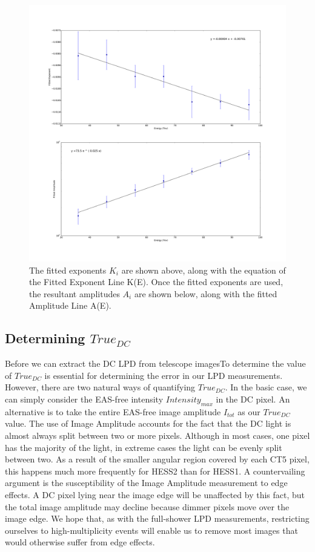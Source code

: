 \documentclass[11pt]{article}
\begin{document}
\begin{figure}
\begin{center}
\includegraphics[width=\textwidth]{lpdpowerlaw}
\caption{The fitted exponents $K_{i}$ are shown above, along with the equation of the Fitted Exponent Line K(E). Once the fitted exponents are used, the resultant amplitudes $A_{i}$ are shown below, along with the fitted Amplitude Line A(E).}
\label{fig:powerlawlpd}
\end{center}
\end{figure}

\subsection{Determining $True_{DC}$}
Before we can extract the DC LPD from telescope imagesTo determine the value of $True_{DC}$ is essential for determining the error in our LPD measurements. However, there are two natural ways of quantifying $True_{DC}$. In the basic case, we can simply consider the EAS-free intensity $Intensity_{max}$ in the DC pixel. An alternative is to take the entire EAS-free image amplitude $I_{tot}$ as our $True_{DC}$ value. The use of Image Amplitude accounts for the fact that the DC light is almost always split between two or more pixels. Although in most cases, one pixel has the majority of the light, in extreme cases the light can be evenly split between two. As a result of the smaller angular region covered by each CT5 pixel, this happens much more frequently for HESS2 than for HESS1. A countervailing argument is the susceptibility of the Image Amplitude measurement to edge effects. A DC pixel lying near the image edge will be unaffected by this fact, but the total image amplitude may decline because dimmer pixels move over the image edge. We hope that, as with the full-shower LPD measurements, restricting ourselves to high-multiplicity events will enable us to remove most images that would otherwise suffer from edge effects.
\end{document}
